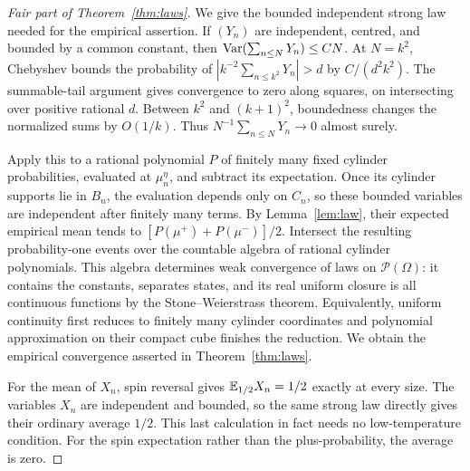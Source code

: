 \begin{proof}[Fair part of Theorem~\ref{thm:laws}]
We give the bounded independent strong law needed for the empirical assertion. If $(Y_n)$ are independent, centred, and bounded by a common constant, then
$\operatorname{Var}(\sum_{n\le N}Y_n)\le C N$. At $N=k^2$, Chebyshev bounds the probability of $|k^{-2}\sum_{n\le k^2}Y_n|>d$ by $C/(d^2k^2)$. The summable-tail argument gives convergence to zero along squares, on intersecting over positive rational $d$. Between $k^2$ and $(k+1)^2$, boundedness changes the normalized sums by $O(1/k)$. Thus $N^{-1}\sum_{n\le N}Y_n\to0$ almost surely.

Apply this to a rational polynomial $P$ of finitely many fixed cylinder probabilities, evaluated at $\mu_n^\eta$, and subtract its expectation. Once its cylinder supports lie in $B_n$, the evaluation depends only on $C_n$, so these bounded variables are independent after finitely many terms. By Lemma~\ref{lem:law}, their expected empirical mean tends to $[P(\mu^+)+P(\mu^-)]/2$. Intersect the resulting probability-one events over the countable algebra of rational cylinder polynomials. This algebra determines weak convergence of laws on $\mathcal P(\Omega)$: it contains the constants, separates states, and its real uniform closure is all continuous functions by the Stone--Weierstrass theorem. Equivalently, uniform continuity first reduces to finitely many cylinder coordinates and polynomial approximation on their compact cube finishes the reduction. We obtain the empirical convergence asserted in Theorem~\ref{thm:laws}.

For the mean of $X_n$, spin reversal gives $\mathbb E_{1/2}X_n=1/2$ exactly at every size. The variables $X_n$ are independent and bounded, so the same strong law directly gives their ordinary average $1/2$. This last calculation in fact needs no low-temperature condition. For the spin expectation rather than the plus-probability, the average is zero.
\end{proof}
